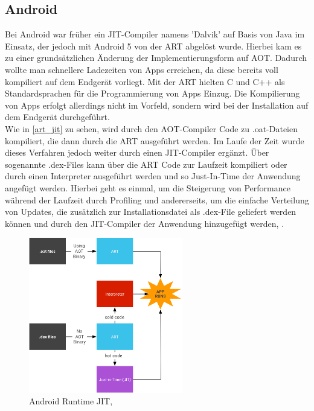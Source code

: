 \subsection{Android} \label{android_bsp}
Bei Android war früher ein \ac{JIT}-Compiler namens 'Dalvik' auf Basis von Java im Einsatz, der jedoch mit Android 5 von der \ac{ART} abgelöst wurde. Hierbei kam es zu einer grundsätzlichen Änderung der Implementierungsform auf \ac{AOT}. Dadurch wollte man schnellere Ladezeiten von Apps erreichen, da diese bereits voll kompiliert auf dem Endgerät vorliegt. Mit der \ac{ART} hielten C und C++ als Standardsprachen für die Programmierung von Apps Einzug. Die Kompilierung von Apps erfolgt allerdings nicht im Vorfeld, sondern wird bei der Installation auf dem Endgerät durchgeführt.\\
Wie in \autoref{art_jit} zu sehen, wird durch den \ac{AOT}-Compiler Code zu .oat-Dateien kompiliert, die dann durch die \ac{ART} ausgeführt werden. Im Laufe der Zeit wurde dieses Verfahren jedoch weiter durch einen \ac{JIT}-Compiler ergänzt. Über sogenannte .dex-Files kann über die \ac{ART} Code zur Laufzeit kompiliert oder durch einen Interpreter ausgeführt werden und so Just-In-Time der Anwendung angefügt werden. Hierbei geht es einmal, um die Steigerung von Performance während der Laufzeit durch Profiling und andererseits, um die einfache Verteilung von Updates, die zusätzlich zur Installationsdatei als .dex-File geliefert werden können und durch den \ac{JIT}-Compiler der Anwendung hinzugefügt werden, \cite[vgl. Android 2022, Webseite abgerufen am 03.12.2022]{android_runtime}.
\begin{figure}[ht]
    \begin{center}
        \includegraphics[width=0.6\textwidth]{assets/img/jit-arch.png}
        \caption{Android Runtime JIT, \cite[Quelle: Android 2022, Webseite abgerufen am 03.12.2022]{android_runtime}}
        \label{art_jit}
    \end{center}
\end{figure}

